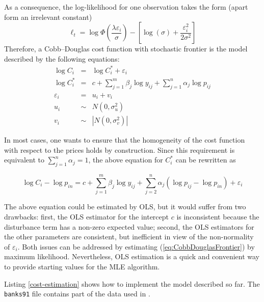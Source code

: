 As a consequence, the log-likelihood for one observation takes the
form (apart form an irrelevant constant)
\[
  \ell_t = 
  \log\Phi\left(\frac{\lambda \varepsilon_i}{\sigma}\right) -
  \left[ \log(\sigma) + \frac{\varepsilon_i^2}{2 \sigma^2} \right]
\]
Therefore, a Cobb--Douglas cost function with stochastic frontier is the
model described by the following equations: 
\begin{eqnarray*}
  \log C_i & = & \log C^*_i + \varepsilon_i \\
  \log C^*_i & = & c + \sum_{j=1}^m \beta_j \log y_{ij} + \sum_{j=1}^n \alpha_j \log p_{ij} \\
  \varepsilon_i & = & u_i + v_i \\
  u_i & \sim & N(0,\sigma_u^2) \\
  v_i & \sim & \left|N(0,\sigma_v^2)\right| 
\end{eqnarray*}

In most cases, one wants to ensure that the homogeneity of the cost
function with respect to the prices holds by construction. Since this
requirement is equivalent to $\sum_{j=1}^n \alpha_j = 1$, the above
equation for $C^*_i$ can be rewritten as

\begin{equation}
  \label{eq:CobbDouglasFrontier}
  \log C_i - \log p_{in}  = c + \sum_{j=1}^m \beta_j \log y_{ij} +
  \sum_{j=2}^n \alpha_j (\log p_{ij} - \log p_{in})  + \varepsilon_i
\end{equation}

The above equation could be estimated by OLS, but it would suffer from
two drawbacks: first, the OLS estimator for the intercept $c$ is
inconsistent because the disturbance term has a non-zero expected
value; second, the OLS estimators for the other parameters are
consistent, but inefficient in view of the non-normality of
$\varepsilon_i$. Both issues can be addressed by estimating
(\ref{eq:CobbDouglasFrontier}) by maximum likelihood. Nevertheless,
OLS estimation is a quick and convenient way to provide starting
values for the MLE algorithm.

Listing \ref{cost-estimation} shows how to implement the model
described so far. The \texttt{banks91} file contains part of the data
used in \citet*{lucchetti01}.

